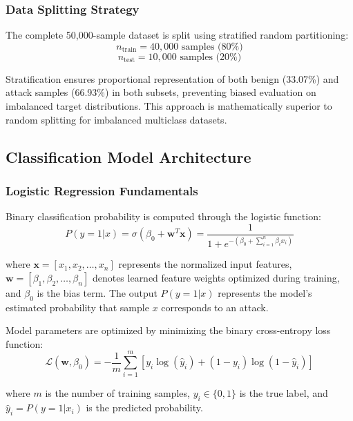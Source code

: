 \documentclass[conference]{IEEEtran}
\begin{document}
\subsubsection{Data Splitting Strategy}

The complete 50,000-sample dataset is split using stratified random partitioning:
\begin{equation}
n_{\text{train}} = 40,000 \text{ samples (80\%)}
\end{equation}
\begin{equation}
n_{\text{test}} = 10,000 \text{ samples (20\%)}
\end{equation}

Stratification ensures proportional representation of both benign (33.07\%) and attack samples (66.93\%) in both subsets, preventing biased evaluation on imbalanced target distributions. This approach is mathematically superior to random splitting for imbalanced multiclass datasets.

\subsection{Classification Model Architecture}

\subsubsection{Logistic Regression Fundamentals}

Binary classification probability is computed through the logistic function:
\begin{equation}
P(y=1|x) = \sigma(\beta_0 + \mathbf{w}^T \mathbf{x}) = \frac{1}{1 + e^{-(\beta_0 + \sum_{i=1}^{n}\beta_i x_i)}}
\end{equation}

where $\mathbf{x} = [x_1, x_2, \ldots, x_n]$ represents the normalized input features, $\mathbf{w} = [\beta_1, \beta_2, \ldots, \beta_n]$ denotes learned feature weights optimized during training, and $\beta_0$ is the bias term. The output $P(y=1|x)$ represents the model's estimated probability that sample $x$ corresponds to an attack.

Model parameters are optimized by minimizing the binary cross-entropy loss function:
\begin{equation}
\mathcal{L}(\mathbf{w}, \beta_0) = -\frac{1}{m} \sum_{i=1}^{m} [y_i \log(\hat{y}_i) + (1-y_i) \log(1-\hat{y}_i)]
\end{equation}

where $m$ is the number of training samples, $y_i \in \{0,1\}$ is the true label, and $\hat{y}_i = P(y=1|x_i)$ is the predicted probability.
\end{document}
